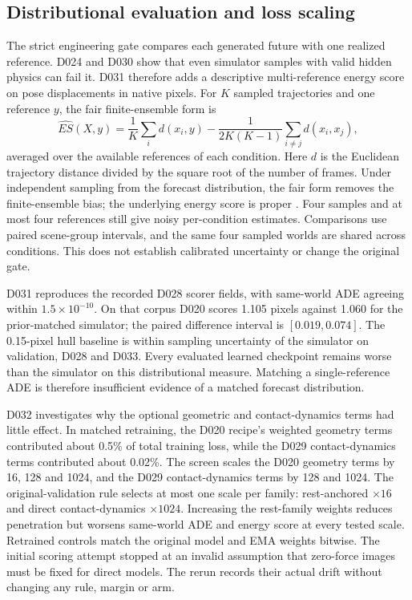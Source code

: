 \subsection{Distributional evaluation and loss scaling}
\label{sec:distribution-followups}
The strict engineering gate compares each generated future with one realized
reference. D024 and D030 show that even simulator samples with valid hidden
physics can fail it. D031 therefore adds a descriptive multi-reference energy
score on pose displacements in native pixels. For $K$ sampled trajectories and
one reference $y$, the fair finite-ensemble form is
\[
 \widehat{ES}(X,y)=\frac{1}{K}\sum_i d(x_i,y)
 -\frac{1}{2K(K-1)}\sum_{i\ne j}d(x_i,x_j),
\]
averaged over the available references of each condition. Here $d$ is the
Euclidean trajectory distance divided by the square root of the number of
frames. Under independent sampling from the forecast distribution, the fair
form removes the finite-ensemble bias; the underlying energy score is proper
\cite{gneiting,ferro}. Four samples and at most four references still give noisy
per-condition estimates. Comparisons use paired scene-group intervals, and the
same four sampled worlds are shared across conditions. This does not establish
calibrated uncertainty or change the original gate.

D031 reproduces the recorded D028 scorer fields, with same-world ADE agreeing
within $1.5\times10^{-10}$. On that corpus D020 scores 1.105 pixels against
1.060 for the prior-matched simulator; the paired difference interval is
$[0.019,0.074]$. The 0.15-pixel hull baseline is within sampling uncertainty of
the simulator on validation, D028 and D033. Every evaluated learned checkpoint
remains worse than the simulator on this distributional measure. Matching a
single-reference ADE is therefore insufficient evidence of a matched forecast
distribution.

D032 investigates why the optional geometric and contact-dynamics terms had
little effect. In matched retraining, the D020 recipe's weighted geometry terms
contributed about 0.5\% of total training loss, while the D029 contact-dynamics
terms contributed about 0.02\%. The screen scales the D020 geometry terms by
16, 128 and 1024, and the D029 contact-dynamics terms by 128 and 1024. The
original-validation rule selects at most one scale per family: rest-anchored
$\times16$ and direct contact-dynamics $\times1024$. Increasing the rest-family
weights reduces penetration but worsens same-world ADE and energy score at
every tested scale. Retrained controls match the original model and EMA weights
bitwise. The initial scoring attempt stopped at an invalid assumption that
zero-force images must be fixed for direct models. The rerun records their
actual drift without changing any rule, margin or arm.

